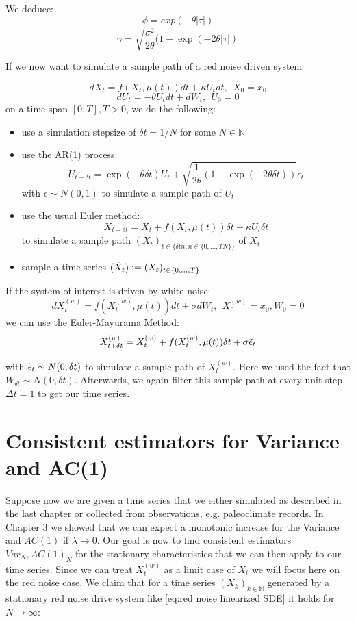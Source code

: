 \documentclass[%
thesis=student,%
coverpage=false,%
titlepage=false,%
headmarks=true, %
english,%
font=libertine, %
math=newpxtx, %
BCOR=5mm,%
coverBCOR=11mm%
]{tumbook}
\begin{document}
We deduce: 
    \[
        \phi = exp(-\theta \lvert \tau \rvert)
    \]
    \[
        \gamma = \sqrt{\frac{\sigma^{2}}{2\theta}(1-\exp(-2\theta \lvert \tau \rvert)}
    \]

If we now want to simulate a sample path of a red noise driven system

\[ 
     dX_{t} = f(X_{t},\mu(t))dt + \kappa U_{t}dt,\ \  X_{0} = x_{0}
\]
\[
     dU_{t} = -\theta U_{t}dt + dW_{t},\ \ U_{0} = 0
\]
on a time span $[0,T], T > 0$, we do the following: 
\begin{itemize}
    \item use a simulation stepsize of $\delta t = 1/N$ for some $N \in \mathbb{N}$
    \item use the AR(1) process:
    \[
    U_{t+\delta t} = \exp(-\theta \delta t)U_{t} + \sqrt{\frac{1}{2\theta}(1-\exp(-2\theta \delta t))}\epsilon_{t}
    \]
    with $\epsilon \sim N(0,1)$ to simulate a sample path of $U_{t}$
    \item use the usual Euler method:
    \[
        X_{t+\delta t} = X_{t} + f(X_{t},\mu(t))\delta t + \kappa U_{t}\delta t
    \]
    to simulate a sample path $(X_{t})_{t\in\{\delta t n, n \in \{0,...,TN\}\}}$ of $X_{t}$
    \item sample a time series $(\Tilde{X}_t) := (X_t)_{t\in\{0,...,T\}}$
\end{itemize}


If the system of interest is driven by white noise: 
\[
    dX_{t}^{(w)} = f(X_{t}^{(w)},\mu(t))dt + \sigma dW_{t}, \ \ X_{0}^{(w)} = x_{0}, W_{0} = 0
\]
we can use the Euler-Mayurama Method:
\[
X_{t+\delta t}^{(w)} = X_{t}^{(w)} + f(X_{t}^{(w)},\mu(t))\delta t + \sigma\Tilde{\epsilon}_t
\]

with $\Tilde{\epsilon}_t \sim N(0,\delta t)$ to simulate a sample path of $X_{t}^{(w)}$. Here we used the fact that $W_{\delta t} \sim N(0,\delta t)$. Afterwards, we again filter this sample path at every unit step $\Delta t = 1$ to get our time series.



\chapter{Consistent estimators for Variance and AC(1)}

Suppose now we are given a time series that we either simulated as described in the last chapter or collected from observations, e.g. paleoclimate records. In Chapter 3 we showed that we can expect a monotonic increase for the Variance and $AC(1)$ if $\lambda \rightarrow 0$. Our goal is now to find consistent estimators $Var_N, AC(1)_N$ for the stationary characteristics that we can then apply to our time series. Since we can treat $X_{t}^{(w)}$ as a limit case of $X_{t}$ we will focus here on the red noise case. We claim that for a time series $(X_{k})_{k\in\mathbb{N}}$ generated by a stationary red noise drive system like \ref{eq:red noise linearized SDE} it holds for $N \rightarrow \infty$:
\end{document}
